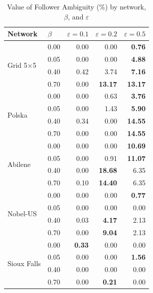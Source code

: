 \begin{table}[htbp]
\centering
\caption{Value of Follower Ambiguity (\%) by network, $\beta$, and $\varepsilon$}
\label{tab:vof}
\begin{tabular}{ll rrr}
\toprule
Network & $\beta$ & $\varepsilon=0.1$ & $\varepsilon=0.2$ & $\varepsilon=0.5$ \\
\midrule
 \multirow{4}{*}{Grid 5$\times$5} & 0.00 & 0.00 & 0.00 & \textbf{0.76} \\
  & 0.05 & 0.00 & 0.00 & \textbf{4.88} \\
  & 0.40 & 0.42 & 3.74 & \textbf{7.16} \\
  & 0.70 & 0.00 & \textbf{13.17} & \textbf{13.17} \\
\midrule
 \multirow{4}{*}{Polska} & 0.00 & 0.00 & 0.63 & \textbf{3.76} \\
  & 0.05 & 0.00 & 1.43 & \textbf{5.90} \\
  & 0.40 & 0.34 & 0.00 & \textbf{14.55} \\
  & 0.70 & 0.00 & 0.00 & \textbf{14.55} \\
\midrule
 \multirow{4}{*}{Abilene} & 0.00 & 0.00 & 0.00 & \textbf{10.69} \\
  & 0.05 & 0.00 & 0.91 & \textbf{11.07} \\
  & 0.40 & 0.00 & \textbf{18.68} & 6.35 \\
  & 0.70 & 0.10 & \textbf{14.40} & 6.35 \\
\midrule
 \multirow{4}{*}{Nobel-US} & 0.00 & 0.00 & 0.00 & \textbf{0.77} \\
  & 0.05 & 0.00 & 0.00 & 0.00 \\
  & 0.40 & 0.03 & \textbf{4.17} & 2.13 \\
  & 0.70 & 0.00 & \textbf{9.04} & 2.13 \\
\midrule
 \multirow{4}{*}{Sioux Falls} & 0.00 & \textbf{0.33} & 0.00 & 0.00 \\
  & 0.05 & 0.00 & 0.00 & \textbf{1.56} \\
  & 0.40 & 0.00 & 0.00 & 0.00 \\
  & 0.70 & 0.00 & \textbf{0.21} & 0.00 \\
\bottomrule
\end{tabular}
\end{table}